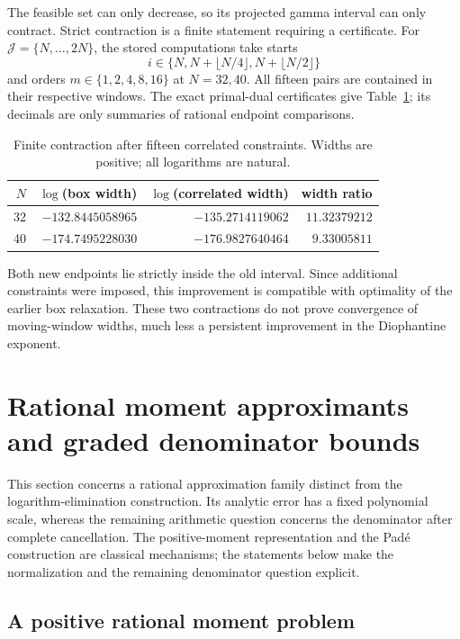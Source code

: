 \documentclass[11pt,a4paper]{article}
\theoremstyle{definition}
\theoremstyle{remark}
\numberwithin{equation}{section}
\begin{document}
The feasible set can only decrease, so its projected gamma interval can
only contract.  Strict contraction is a finite statement requiring a
certificate.  For $\mathcal J=\{N,\ldots,2N\}$, the stored computations
take starts
\[
 i\in\{N,N+\lfloor N/4\rfloor,N+\lfloor N/2\rfloor\}
\]
and orders $m\in\{1,2,4,8,16\}$ at $N=32,40$.  All fifteen pairs
are contained in their respective windows.  The exact primal-dual
certificates give Table~\ref{pm:tab:correlated}; its decimals are only
summaries of rational endpoint comparisons.

\begin{table}[htbp]
\centering
\caption{Finite contraction after fifteen correlated constraints.
Widths are positive; all logarithms are natural.}\label{pm:tab:correlated}
\begin{tabular}{rrrr}
\toprule
$N$ & $\log$(box width) & $\log$(correlated width) & width ratio\\
\midrule
32 & $-132.8445058965$ & $-135.2714119062$ & $11.32379212$\\
40 & $-174.7495228030$ & $-176.9827640464$ & $9.33005811$\\
\bottomrule
\end{tabular}
\end{table}

Both new endpoints lie strictly inside the old interval.  Since additional
constraints were imposed, this improvement is compatible with optimality
of the earlier box relaxation.  These two contractions do not prove
convergence of moving-window widths, much less a persistent improvement in
the Diophantine exponent.


\section{Rational moment approximants and graded denominator bounds}
\label{pm:ht:section}

This section concerns a rational approximation family distinct from the
logarithm-elimination construction.  Its analytic error has a fixed
polynomial scale, whereas the remaining arithmetic question concerns
the denominator after complete cancellation.  The positive-moment
representation and the Pad\'e construction are classical mechanisms;
the statements below make the normalization and the remaining
denominator question explicit.

\subsection{A positive rational moment problem}
\end{document}

